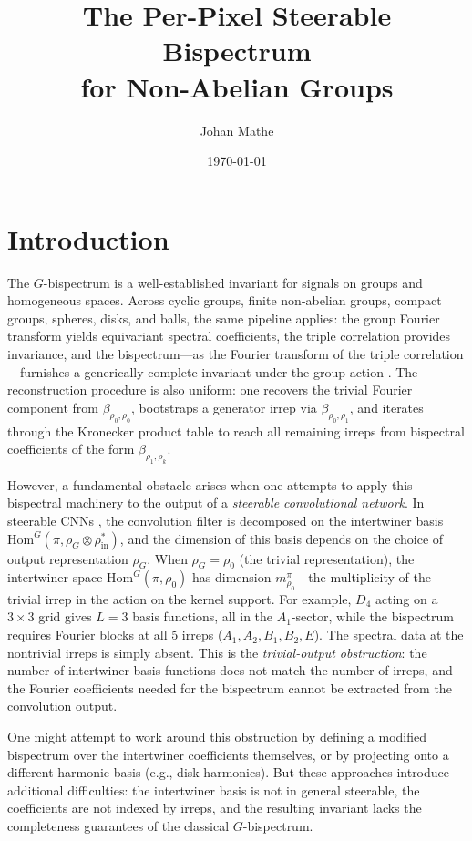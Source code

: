 \documentclass{article}
\title{The Per-Pixel Steerable Bispectrum\\for Non-Abelian Groups}
\author{Johan Mathe}
\date{\today}
\theoremstyle{definition}
\theoremstyle{remark}
\newcommand{\Hom}{\mathrm{Hom}}
\begin{document}
\maketitle

\section{Introduction}

The $G$-bispectrum is a well-established invariant for signals on groups and homogeneous spaces. Across cyclic groups, finite non-abelian groups, compact groups, spheres, disks, and balls, the same pipeline applies: the group Fourier transform yields equivariant spectral coefficients, the triple correlation provides invariance, and the bispectrum---as the Fourier transform of the triple correlation---furnishes a generically complete invariant under the group action \cite{kakarala1992, kakarala2009, kondor2008}. The reconstruction procedure is also uniform: one recovers the trivial Fourier component from $\beta_{\rho_0,\rho_0}$, bootstraps a generator irrep via $\beta_{\rho_0,\rho_1}$, and iterates through the Kronecker product table to reach all remaining irreps from bispectral coefficients of the form $\beta_{\rho_1, \rho_k}$.

However, a fundamental obstacle arises when one attempts to apply this bispectral machinery to the output of a \textit{steerable convolutional network}. In steerable CNNs \cite{weiler2019}, the convolution filter is decomposed on the intertwiner basis $\Hom^G(\pi, \rho_G \otimes \rho_{\mathrm{in}}^*)$, and the dimension of this basis depends on the choice of output representation $\rho_G$. When $\rho_G = \rho_0$ (the trivial representation), the intertwiner space $\Hom^G(\pi, \rho_0)$ has dimension $m^\pi_{\rho_0}$---the multiplicity of the trivial irrep in the action on the kernel support. For example, $D_4$ acting on a $3 \times 3$ grid gives $L = 3$ basis functions, all in the $A_1$-sector, while the bispectrum requires Fourier blocks at all 5 irreps ($A_1, A_2, B_1, B_2, E$). The spectral data at the nontrivial irreps is simply absent. This is the \textit{trivial-output obstruction}: the number of intertwiner basis functions does not match the number of irreps, and the Fourier coefficients needed for the bispectrum cannot be extracted from the convolution output.

One might attempt to work around this obstruction by defining a modified bispectrum over the intertwiner coefficients themselves, or by projecting onto a different harmonic basis (e.g., disk harmonics). But these approaches introduce additional difficulties: the intertwiner basis is not in general steerable, the coefficients are not indexed by irreps, and the resulting invariant lacks the completeness guarantees of the classical $G$-bispectrum.
\end{document}
